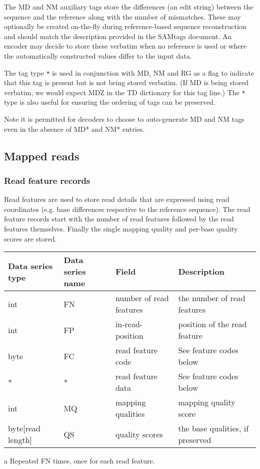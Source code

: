 \documentclass[a4paper]{article}
\begin{document}
The MD and NM auxiliary tags store the differences (an edit string) between the sequence and the reference along with the number of mismatches.
These may optionally be created on-the-fly during reference-based sequence reconstruction and should match the description provided in the SAMtags document.
An encoder may decide to store these verbatim when no reference is used or where the automatically constructed values differ to the input data.

The tag type \texttt{*} is used in conjunction with MD, NM and RG as a flag to indicate that this tag is present but is not being stored verbatim.
(If MD is being stored verbatim, we would expect MDZ in the TD dictionary for this tag line.)
The \texttt{*} type is also useful for ensuring the ordering of tags can be preserved.

Note it is permitted for decoders to choose to auto-generate MD and NM tags even in the absence of MD* and NM* entries.

\subsection{Mapped reads}
\label{subsec:mapped}

\subsubsection*{Read feature records}
\label{subsec:features}

Read features are used to store read details that are expressed using read coordinates 
(e.g. base differences respective to the reference sequence). The read feature 
records start with the number of read features followed by the read features themselves.
Finally the single mapping quality and per-base quality scores are stored.

\begin{threeparttable}[t]
\begin{tabular}{|>{\raggedright}p{88pt}|>{\raggedright}p{83pt}|>{\raggedright}p{85pt}|>{\raggedright}p{180pt}|}
\hline
\textbf{Data series type} & \textbf{Data series name} & \textbf{Field} & \textbf{Description}\tabularnewline
\hline
int & FN & number of read features & the number of read features\tabularnewline
\hline
int & FP & in-read-position\tnote{a} & position of the read feature\tabularnewline 
\hline
byte & FC & read feature code\tnote{a} & See feature codes below\tabularnewline
\hline
* & * & read feature data\tnote{a} & See feature codes below\tabularnewline
\hline
int & MQ & mapping qualities & mapping quality score\tabularnewline
\hline
byte[read length] & QS & quality scores & the base qualities, if preserved\tabularnewline
\hline
\end{tabular}
\begin{tablenotes}
\item[a] Repeated FN times, once for each read feature.
\end{tablenotes}
\end{threeparttable}
\end{document}
